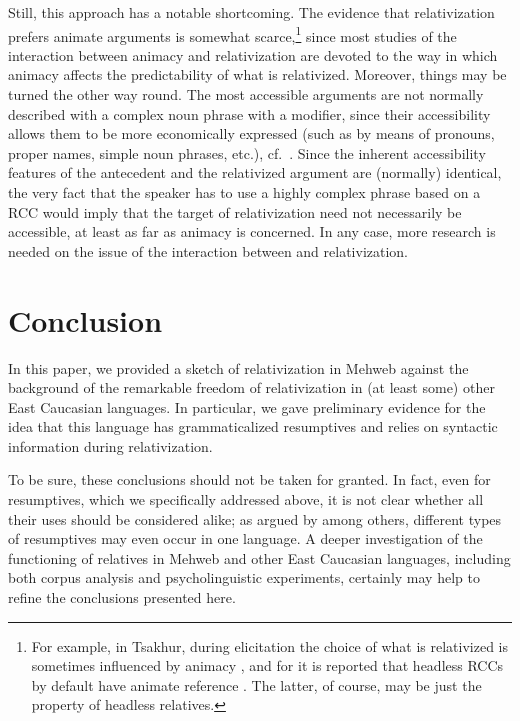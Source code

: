 ﻿\documentclass[output=paper]{langsci/langscibook}
\begin{document}
Still, this approach has a notable shortcoming. The evidence that
relativization prefers animate arguments is somewhat scarce,\footnote{\label{fn14}For
  example, in Tsakhur, during elicitation the choice of what is
  relativized is sometimes influenced by animacy \citep[476–477]{lyutikova1999},
  and for  it is reported that headless RCCs by
  default have animate reference \citep{kerslake1998}. The latter, of course,
  may be just the property of headless relatives.} since most studies of
the interaction between animacy and relativization are devoted to the
way in which animacy affects the predictability of what is relativized.
Moreover, things may be turned the other way round. The most accessible
arguments are not normally described with a complex noun phrase with a
modifier, since their accessibility allows them to be more economically
expressed (such as by means of pronouns, proper names, simple noun
phrases, etc.), cf.\ \citet{ariel1990}. Since the inherent accessibility
features of the antecedent and the relativized argument are (normally)
identical, the very fact that the speaker has to use a highly complex
phrase based on a RCC would imply that the target of relativization need
not necessarily be accessible, at least as far as animacy is concerned.
In any case, more research is needed on the issue of the interaction
between  and relativization.

\section{Conclusion}

In this paper, we provided a sketch of relativization in Mehweb against
the background of the remarkable freedom of relativization in (at least
some) other East Caucasian languages. In particular, we gave preliminary
evidence for the idea that this language has grammaticalized resumptives
and relies on syntactic information during relativization.

To be sure, these conclusions should not be taken for granted. In fact,
even for resumptives, which we specifically addressed above, it is not
clear whether all their uses should be considered alike; as argued by
\citet{erteschik-shir1992} among others,
different types of resumptives may even occur in one language. A deeper
investigation of the functioning of relatives in Mehweb and other East
Caucasian languages, including both corpus analysis and psycholinguistic
experiments, certainly may help to refine the conclusions presented
here.
\end{document}
